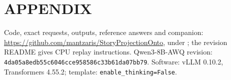 \documentclass[a4paper,twoside]{article}
\begin{document}

{\small}
\section*{APPENDIX}
\noindent Code, exact requests, outputs, reference answers and companion: \url{https://github.com/mantzaris/StoryProjectionOnto}, under ; the revision README gives CPU replay instructions. Qwen3-8B-AWQ revision: \texttt{4da05a8edb55c6046cce9585}\allowbreak\texttt{86c33b61da07bb79}. Software: vLLM 0.10.2, Transformers 4.55.2; template: \texttt{enable\_thinking=False}.
\end{document}
